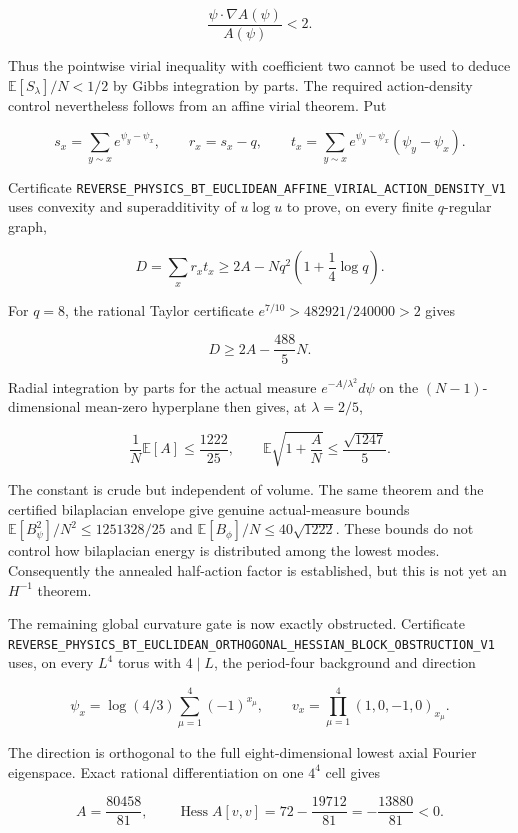 \documentclass[11pt]{article}
\theoremstyle{definition}
\theoremstyle{remark}
\newcommand{\cert}[1]{\nolinkurl{#1}}
\begin{document}
\[
 \frac{\psi\cdot\nabla A(\psi)}{A(\psi)}<2.
\]

Thus the pointwise virial inequality with coefficient two cannot be used to
deduce \(\mathbb E[S_\lambda]/N<1/2\) by Gibbs integration by parts.  The
required action-density control nevertheless follows from an affine virial
theorem.  Put

\[
 s_x=\sum_{y\sim x}e^{\psi_y-\psi_x},\qquad r_x=s_x-q,
 \qquad t_x=\sum_{y\sim x}e^{\psi_y-\psi_x}(\psi_y-\psi_x).
\]

Certificate
\cert{REVERSE_PHYSICS_BT_EUCLIDEAN_AFFINE_VIRIAL_ACTION_DENSITY_V1}
uses convexity and superadditivity of \(u\log u\) to prove, on every finite
\(q\)-regular graph,

\[
 D=\sum_xr_xt_x
 \geq2A-Nq^2\left(1+\frac14\log q\right).
\]

For \(q=8\), the rational Taylor certificate
\(e^{7/10}>482921/240000>2\) gives

\[
                    D\geq2A-\frac{488}{5}N.
\]

Radial integration by parts for the actual measure
\(e^{-A/\lambda^2}d\psi\) on the \((N-1)\)-dimensional mean-zero hyperplane
then gives, at \(\lambda=2/5\),

\[
 \frac1N\mathbb E[A]\leq\frac{1222}{25},
 \qquad
 \mathbb E\sqrt{1+\frac AN}\leq\frac{\sqrt{1247}}5.
\]

The constant is crude but independent of volume.  The same theorem and the
certified bilaplacian envelope give genuine actual-measure bounds
\(\mathbb E[B_\psi^2]/N^2\leq1251328/25\) and
\(\mathbb E[B_\phi]/N\leq40\sqrt{1222}\).  These bounds do not control how
bilaplacian energy is distributed among the lowest modes.  Consequently the
annealed half-action factor is established, but this is not yet an
\(H^{-1}\) theorem.

The remaining global curvature gate is now exactly obstructed.  Certificate
\cert{REVERSE_PHYSICS_BT_EUCLIDEAN_ORTHOGONAL_HESSIAN_BLOCK_OBSTRUCTION_V1}
uses, on every \(L^4\) torus with \(4\mid L\), the period-four background and
direction

\[
 \psi_x=\log(4/3)\sum_{\mu=1}^4(-1)^{x_\mu},\qquad
 v_x=\prod_{\mu=1}^4(1,0,-1,0)_{x_\mu}.
\]

The direction is orthogonal to the full eight-dimensional lowest axial
Fourier eigenspace.  Exact rational differentiation on one \(4^4\) cell gives

\[
 A=\frac{80458}{81},\qquad
 \operatorname{Hess}A[v,v]=72-\frac{19712}{81}
 =-\frac{13880}{81}<0.
\]
\end{document}
